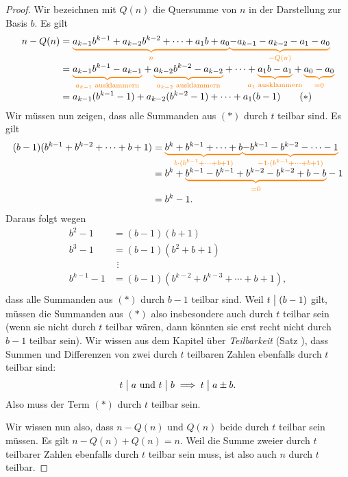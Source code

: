 \documentclass[../../main.tex]{subfiles}
\begin{document}
\begin{proof}
    Wir bezeichnen mit $Q(n)$ die Quersumme von $n$ in der Darstellung zur Basis $b$. Es gilt
    \begin{align*}
        n-Q(n)&=\colorbrace{a_{k-1}b^{k-1}+a_{k-2}b^{k-2}+\dots+a_1b+a_0}{n}\colorbrace{-a_{k-1}-a_{k-2}-a_1-a_0}{-Q(n)}\\
        &=\colorbrace{a_{k-1}b^{k-1}-a_{k-1}}{a_{k-1}\text{ ausklammern}}+\colorbrace{a_{k-2}b^{k-2}-a_{k-2}}{a_{k-2}\text{ ausklammern}}+\dots+\colorbrace{a_1b-a_1}{a_1\text{ ausklammern}}+\colorbrace{a_0-a_0}{=0}\\
        &=a_{k-1}(b^{k-1}-1)+a_{k-2}(b^{k-2}-1)+\dots+a_1(b-1)\tag{$*$}
    \end{align*}
    Wir müssen nun zeigen, dass alle Summanden aus $(*)$ durch $t$ teilbar sind. Es gilt
    \begin{align*}
        (b-1)(b^{k-1}+b^{k-2}+\cdots+b+1)
        &=\colorbrace{b^k+b^{k-1}+\cdots+b}{b\cdot(b^{k-1}+\cdots+b+1)}\colorbrace{-b^{k-1}-b^{k-2}-\cdots-1}{-1\cdot(b^{k-1}+\cdots+b+1)}\\
        &=b^k+\colorbrace{b^{k-1}-b^{k-1}+b^{k-2}-b^{k-2}+b-b}{=0}-1\\
        &=b^k-1.
    \end{align*}
    Daraus folgt wegen
    \begin{align*}
        b^2-1&=(b-1)(b+1)\\
        b^3-1&=(b-1)(b^2+b+1)\\
        &~\,\vdots\\
        b^{k-1}-1&=(b-1)(b^{k-2}+b^{k-3}+\cdots+b+1),\\
    \end{align*}
    dass alle Summanden aus $(*)$ durch $b-1$ teilbar sind. Weil $t\divides (b-1)$ gilt, müssen die Summanden aus $(*)$ 
    also insbesondere auch durch $t$ teilbar sein (wenn sie nicht durch $t$ teilbar wären, dann könnten sie erst recht 
    nicht durch $b-1$ teilbar sein). Wir wissen aus dem Kapitel über \emph{Teilbarkeit} (Satz \mayberef), dass Summen 
    und Differenzen von zwei durch $t$ teilbaren Zahlen ebenfalls durch $t$ teilbar sind:
    \[t\divides a\text{ und }t\divides b\implies t\divides a\pm b.\] 
    Also muss der Term $(*)$ durch $t$ teilbar sein. 

    Wir wissen nun also, dass $n-Q(n)$ und $Q(n)$ beide durch $t$ teilbar sein müssen. Es gilt $n-Q(n)+Q(n)=n$. Weil die
    Summe zweier durch $t$ teilbarer Zahlen ebenfalls durch $t$ teilbar sein muss, ist also auch $n$ durch $t$ teilbar.
\end{proof}
\end{document}
